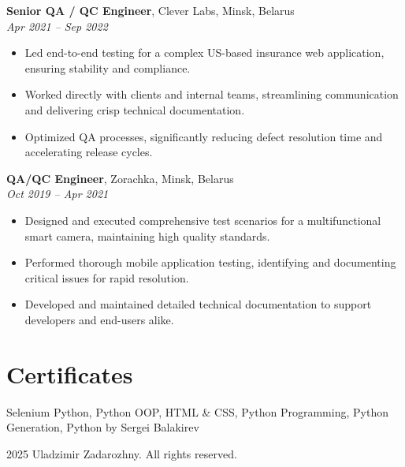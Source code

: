 \documentclass[11pt,a4paper]{article}
\begin{document}
\textbf{Senior QA / QC Engineer}, Clever Labs, Minsk, Belarus \\
\textit{Apr 2021 -- Sep 2022}
\begin{itemize}
  \item Led end-to-end testing for a complex US-based insurance web application, ensuring stability and compliance.
  \item Worked directly with clients and internal teams, streamlining communication and delivering crisp technical documentation.
  \item Optimized QA processes, significantly reducing defect resolution time and accelerating release cycles.
\end{itemize}

\textbf{QA/QC Engineer}, Zorachka, Minsk, Belarus \\
\textit{Oct 2019 -- Apr 2021}
\begin{itemize}
  \item Designed and executed comprehensive test scenarios for a multifunctional smart camera, maintaining high quality standards.
  \item Performed thorough mobile application testing, identifying and documenting critical issues for rapid resolution.
  \item Developed and maintained detailed technical documentation to support developers and end-users alike.
\end{itemize}

\section*{Certificates}
Selenium Python, Python OOP, HTML \& CSS, Python Programming, Python Generation, Python by Sergei Balakirev

\vfill
\begin{center}
  \textcopyright{} 2025 Uladzimir Zadarozhny. All rights reserved.
\end{center}
\end{document}
